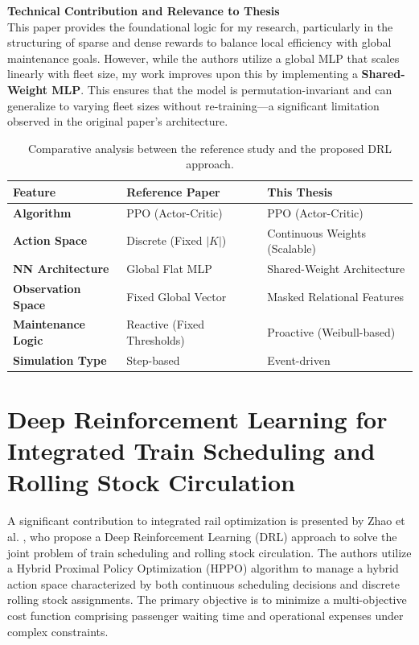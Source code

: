 \documentclass[a4paper]{scrartcl}
\begin{document}
\textbf{Technical Contribution and Relevance to Thesis} \\
This paper provides the foundational logic for my research, particularly in the structuring of sparse and dense rewards to balance local efficiency with global maintenance goals. However, while the authors utilize a global MLP that scales linearly with fleet size, my work improves upon this by implementing a \textbf{Shared-Weight MLP}. This ensures that the model is permutation-invariant and can generalize to varying fleet sizes without re-training—a significant limitation observed in the original paper's architecture.

\begin{table}[H]
    \centering
    \begin{tabular}{|p{3.5cm}|p{5cm}|p{5.5cm}|}
        \hline
        \textbf{Feature} & \textbf{Reference Paper} & \textbf{This Thesis} \\ \hline
        \textbf{Algorithm} & PPO (Actor-Critic) & PPO (Actor-Critic) \\ \hline
        \textbf{Action Space} & Discrete (Fixed $|K|$) & Continuous Weights (Scalable) \\ \hline
        \textbf{NN Architecture} & Global Flat MLP & Shared-Weight Architecture \\ \hline
        \textbf{Observation Space} & Fixed Global Vector & Masked Relational Features \\ \hline
        \textbf{Maintenance Logic} & Reactive (Fixed Thresholds) & Proactive (Weibull-based) \\ \hline
        \textbf{Simulation Type} & Step-based & Event-driven \\ \hline
    \end{tabular}
    \caption{Comparative analysis between the reference study and the proposed DRL approach.}
    \label{tab:methodology_comparison}
\end{table}
\section{Deep Reinforcement Learning for Integrated Train Scheduling and Rolling Stock Circulation}

A significant contribution to integrated rail optimization is presented by Zhao et al. \cite{ZHAO2026111784}, who propose a Deep Reinforcement Learning (DRL) approach to solve the joint problem of train scheduling and rolling stock circulation. The authors utilize a Hybrid Proximal Policy Optimization (HPPO) algorithm to manage a hybrid action space characterized by both continuous scheduling decisions and discrete rolling stock assignments. The primary objective is to minimize a multi-objective cost function comprising passenger waiting time and operational expenses under complex constraints.
\end{document}
